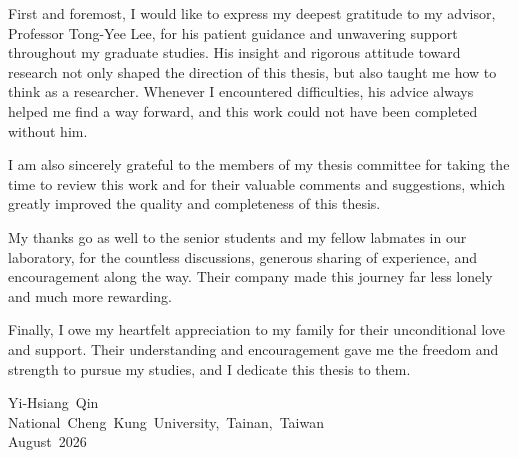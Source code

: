 First and foremost, I would like to express my deepest gratitude to my advisor,
Professor Tong-Yee Lee, for his patient guidance and unwavering support
throughout my graduate studies.
His insight and rigorous attitude toward research not only shaped the direction
of this thesis, but also taught me how to think as a researcher.
Whenever I encountered difficulties, his advice always helped me find a way
forward, and this work could not have been completed without him.

I am also sincerely grateful to the members of my thesis committee for taking
the time to review this work and for their valuable comments and suggestions,
which greatly improved the quality and completeness of this thesis.

My thanks go as well to the senior students and my fellow labmates in our
laboratory, for the countless discussions, generous sharing of experience, and
encouragement along the way.
Their company made this journey far less lonely and much more rewarding.

Finally, I owe my heartfelt appreciation to my family for their unconditional
love and support.
Their understanding and encouragement gave me the freedom and strength to
pursue my studies, and I dedicate this thesis to them.

\begin{flushright}
\mbox{Yi-Hsiang Qin}\\
\mbox{National Cheng Kung University, Tainan, Taiwan}\\
\mbox{August 2026}
\end{flushright}
